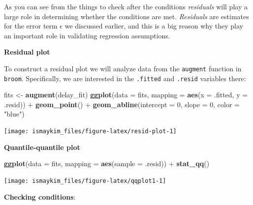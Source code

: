 \documentclass[]{tufte-book}
\newenvironment{Shaded}{\begin{snugshade}}{\end{snugshade}}
\newcommand{\KeywordTok}[1]{\textcolor[rgb]{0.13,0.29,0.53}{\textbf{{#1}}}}
\newcommand{\DataTypeTok}[1]{\textcolor[rgb]{0.13,0.29,0.53}{{#1}}}
\newcommand{\DecValTok}[1]{\textcolor[rgb]{0.00,0.00,0.81}{{#1}}}
\newcommand{\StringTok}[1]{\textcolor[rgb]{0.31,0.60,0.02}{{#1}}}
\newcommand{\NormalTok}[1]{{#1}}
\theoremstyle{definition}
\theoremstyle{definition}
\theoremstyle{remark}
\begin{document}
As you can see from the things to check after the conditions
\emph{residuals} will play a large role in determining whether the
conditions are met. \emph{Residuals} are estimates for the error term
\(\epsilon\) we discussed earlier, and this is a big reason why they
play an important role in validating regression assumptions.

\textbf{Residual plot}

To construct a residual plot we will analyze data from the
\texttt{augment} function in \texttt{broom}. Specifically, we are
interested in the \texttt{.fitted} and \texttt{.resid} variables there:

\begin{Shaded}
\begin{Highlighting}[]
\NormalTok{fits <-}\StringTok{ }\KeywordTok{augment}\NormalTok{(delay_fit)}
\KeywordTok{ggplot}\NormalTok{(}\DataTypeTok{data =} \NormalTok{fits, }\DataTypeTok{mapping =} \KeywordTok{aes}\NormalTok{(}\DataTypeTok{x =} \NormalTok{.fitted, }\DataTypeTok{y =} \NormalTok{.resid)) +}
\StringTok{  }\KeywordTok{geom_point}\NormalTok{() +}
\StringTok{  }\KeywordTok{geom_abline}\NormalTok{(}\DataTypeTok{intercept =} \DecValTok{0}\NormalTok{, }\DataTypeTok{slope =} \DecValTok{0}\NormalTok{, }\DataTypeTok{color =} \StringTok{"blue"}\NormalTok{)}
\end{Highlighting}
\end{Shaded}

\begin{center}\texttt{[image: ismaykim\_files/figure-latex/resid-plot-1]} \end{center}

\textbf{Quantile-quantile plot}

\begin{Shaded}
\begin{Highlighting}[]
\KeywordTok{ggplot}\NormalTok{(}\DataTypeTok{data =} \NormalTok{fits, }\DataTypeTok{mapping =} \KeywordTok{aes}\NormalTok{(}\DataTypeTok{sample =} \NormalTok{.resid)) +}
\StringTok{  }\KeywordTok{stat_qq}\NormalTok{()}
\end{Highlighting}
\end{Shaded}

\begin{center}\texttt{[image: ismaykim\_files/figure-latex/qqplot1-1]} \end{center}

\textbf{Checking conditions}:
\end{document}
